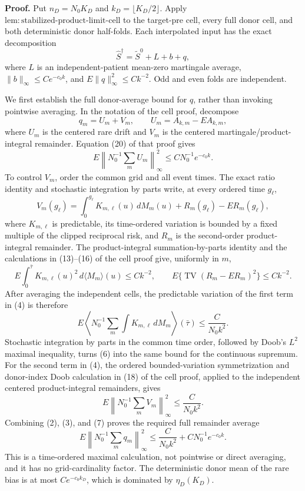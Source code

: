 \textbf{Proof.}
Put \(n_D=N_0K_D\) and \(k_D=\lfloor K_D/2\rfloor\).  Apply
\(\mathrm{lem:stabilized\mbox{-}product\mbox{-}limit\mbox{-}cell}\) to
the target-pre cell, every full donor cell, and both deterministic donor
half-folds.  Each interpolated input has the exact decomposition
\[
 \widehat S^\dagger=\widetilde S^0+L+b+q,                 \tag{1}
\]
where \(L\) is an independent-patient mean-zero martingale average,
\(\|b\|_\infty\leq Ce^{-c_0k}\), and
\(E\|q\|_\infty^2\leq Ck^{-2}\).  Odd and even folds are independent.

We first establish the full donor-average bound for \(q\), rather than invoking
pointwise averaging.  In the notation of the cell proof, decompose
\[
 q_m=U_m+V_m,
 \qquad U_m=A_{k,m}-EA_{k,m},                              \tag{2}
\]
where \(U_m\) is the centered rare drift and \(V_m\) is the centered
martingale/product-integral remainder.  Equation (20) of that proof gives
\[
 E\left\|N_0^{-1}\sum_mU_m\right\|_\infty^2
 \leq CN_0^{-1}e^{-c_0k}.                                 \tag{3}
\]
To control \(V_m\), order the common grid and all event times.  The exact ratio
identity and stochastic integration by parts write, at every ordered time
\(g_\ell\),
\[
 V_m(g_\ell)
 =\int_0^{g_\ell}K_{m,\ell}(u)\,dM_m(u)
   +R_m(g_\ell)-ER_m(g_\ell),                             \tag{4}
\]
where \(K_{m,\ell}\) is predictable, its time-ordered variation is bounded by a
fixed multiple of the clipped reciprocal risk, and \(R_m\) is the
second-order product-integral remainder.  The product-integral summation-by-parts
identity and the calculations in (13)--(16) of the cell proof give, uniformly in
\(m\),
\[
 E\int_0^{\bar\tau}K_{m,\ell}(u)^2\,d\langle M_m\rangle(u)
 \leq Ck^{-2},
 \qquad
 E\{\operatorname{TV}(R_m-ER_m)^2\}
 \leq Ck^{-2}.                                             \tag{5}
\]
After averaging the independent cells, the predictable variation of the first
term in (4) is therefore
\[
 E\left\langle N_0^{-1}\sum_m\int K_{m,\ell}\,dM_m
 \right\rangle(\bar\tau)
 \leq \frac{C}{N_0k^2}.                                   \tag{6}
\]
Stochastic integration by parts in the common time order, followed by Doob's
\(L^2\) maximal inequality, turns (6) into the same bound for the continuous
supremum.  For the second term in (4), the ordered bounded-variation
symmetrization and donor-index Doob calculation in (18) of the cell proof,
applied to the independent centered product-integral remainders, gives
\[
 E\left\|N_0^{-1}\sum_mV_m\right\|_\infty^2
 \leq\frac{C}{N_0k^2}.                                    \tag{7}
\]
Combining (2), (3), and (7) proves the required full remainder average
\[
 E\left\|N_0^{-1}\sum_mq_m\right\|_\infty^2
 \leq\frac{C}{N_0k^2}+CN_0^{-1}e^{-c_0k}.                \tag{8}
\]
This is a time-ordered maximal calculation, not pointwise or direct averaging,
and it has no grid-cardinality factor.  The deterministic donor mean of the rare
bias is at most \(Ce^{-c_0k_D}\), which is dominated by
\(\eta_D(K_D)\).

